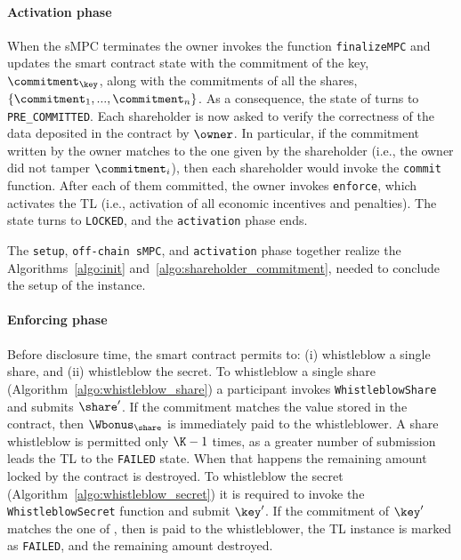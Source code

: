 \medskip

\paragraph*{Activation phase}
When the sMPC terminates the owner invokes the function \texttt{finalizeMPC} and updates the smart contract state with the commitment of the key, $ \commitment _\key $, along with the commitments of all the shares, $\{ \commitment _1 , ... , \commitment _n \}$. 
As a consequence, the state of \shortname turns to \texttt{PRE\_COMMITTED}. 
Each shareholder is now asked to verify the correctness of the data deposited in the contract by $\owner$. 
In particular, if the commitment written by the owner matches to the one given by the shareholder (i.e., the owner did not tamper $\commitment_i$), then each shareholder would invoke the \texttt{commit} function. 
After each of them committed, the owner invokes \texttt{enforce}, which activates the TL (i.e., activation of all economic incentives and penalties). 
The state turns to \texttt{LOCKED}, and the \texttt{activation} phase ends.

The \texttt{setup}, \texttt{off-chain sMPC}, and \texttt{activation} phase together realize the Algorithms~\ref{algo:init} and~\ref{algo:shareholder_commitment}, needed to conclude the setup of the \shortname instance. 

\medskip

\paragraph*{Enforcing phase}\label{sect:impl_enf_brief}

Before disclosure time, the smart contract permits to: (i) whistleblow a single share, and (ii) whistleblow the secret.
To whistleblow a single share (Algorithm~\ref{algo:whistleblow_share}) a participant invokes \texttt{WhistleblowShare} and submits $\share\sp{\prime}$.
If the commitment matches the value stored in the contract, then $\Wbonus_{\share}$ is immediately paid to the whistleblower.
A share whistleblow is permitted only $\K - 1 $ times, as a greater number of submission leads the TL to the \texttt{FAILED} state.
When that happens the remaining amount locked by the contract is destroyed.
To whistleblow the secret (Algorithm~\ref{algo:whistleblow_secret}) it is required to invoke the \texttt{WhistleblowSecret} function and submit $\key \sp{\prime} $.
If the commitment of $\key \sp{\prime} $ matches the one of \key, then \Wsecret is paid to the whistleblower, the TL instance is marked as \texttt{FAILED}, and the remaining amount destroyed.

